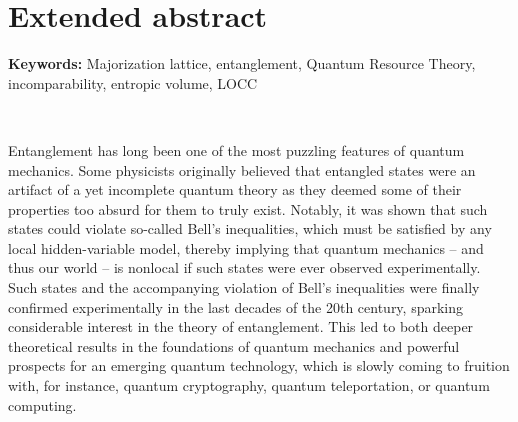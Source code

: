 \section*{Extended abstract}

\textbf{Keywords:} Majorization lattice, entanglement, Quantum Resource Theory, incomparability, entropic volume, LOCC

~

Entanglement has long been one of the most puzzling features of quantum mechanics. Some physicists originally believed that entangled states were an artifact of a yet incomplete quantum theory as they deemed some of their properties too absurd for them to truly exist. Notably, it was shown that such states could violate so-called Bell’s inequalities, which must be satisfied by any local hidden-variable model, thereby implying that quantum mechanics – and thus our world – is nonlocal if such states were ever observed experimentally. Such states and the accompanying violation of Bell’s inequalities were finally confirmed experimentally in the last decades of the 20th century, sparking considerable interest in the theory of entanglement.  This led to both deeper theoretical results in the foundations of quantum mechanics and powerful prospects for an emerging quantum technology, which is slowly coming to fruition with, for instance, quantum cryptography, quantum teleportation, or quantum computing.

